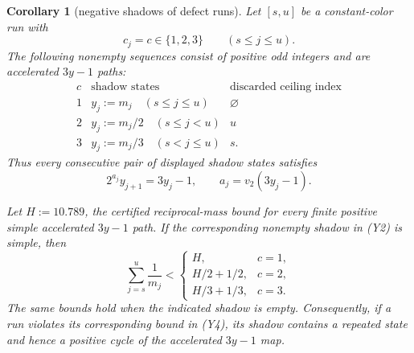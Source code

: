 \documentclass[11pt]{article}
\newtheorem{corollary}[theorem]{Corollary}
\begin{document}
\begin{corollary}[negative shadows of defect runs]
Let $[s,u]$ be a constant-color run with
\[
  c_j=c\in\{1,2,3\}
  \qquad(s\leq j\leq u).
  \tag{Y1}
\]
The following nonempty sequences consist of positive odd integers and are
accelerated $3y-1$ paths:
\[
\begin{array}{c|c|c}
  c&\text{shadow states}&\text{discarded ceiling index}\\ \hline
  1&y_j:=m_j\quad(s\leq j\leq u)&\varnothing\\
  2&y_j:=m_j/2\quad(s\leq j<u)&u\\
  3&y_j:=m_j/3\quad(s<j\leq u)&s.
\end{array}
\tag{Y2}
\]
Thus every consecutive pair of displayed shadow states satisfies
\[
\boxed{
  2^{a_j}y_{j+1}=3y_j-1,
  \qquad
  a_j=v_2(3y_j-1).}
\tag{Y3}
\]

Let $H:=10.789$, the certified reciprocal-mass bound for every finite
positive simple accelerated $3y-1$ path.  If the corresponding nonempty
shadow in (Y2) is simple, then
\[
\boxed{
  \sum_{j=s}^{u}\frac1{m_j}
  <
  \begin{cases}
    H,&c=1,\\[1mm]
    H/2+1/2,&c=2,\\[1mm]
    H/3+1/3,&c=3.
  \end{cases}}
\tag{Y4}
\]
The same bounds hold when the indicated shadow is empty.  Consequently,
if a run violates its corresponding bound in (Y4), its shadow contains a
repeated state and hence a positive cycle of the accelerated $3y-1$ map.
\end{corollary}
\end{document}

